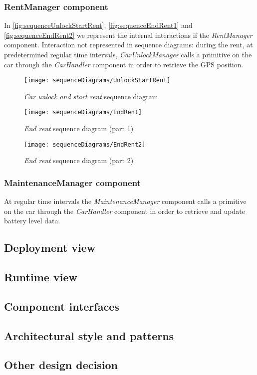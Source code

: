 \subsubsection{RentManager component}
In \autoref{fig:sequenceUnlockStartRent}, \autoref{fig:sequenceEndRent1} and \autoref{fig:sequenceEndRent2} we represent the internal interactions if the \emph{RentManager} component.
Interaction not represented in sequence diagrams: during the rent, at predetermined regular time intervals, \emph{CarUnlockManager} calls a primitive on the car through the \emph{CarHandler} component in order to retrieve the GPS position.
\begin{figure}[h!]
	\centering
	\texttt{[image: sequenceDiagrams/UnlockStartRent]}
	\caption{
		\label{fig:sequenceUnlockStartRent} 
		\emph{Car unlock and start rent} sequence diagram
	}
\end{figure}
\begin{figure}[h!]
	\centering
	\texttt{[image: sequenceDiagrams/EndRent]}
	\caption{
		\label{fig:sequenceEndRent1} 
		\emph{End rent} sequence diagram (part 1)
	}
\end{figure}
\begin{figure}[h!]
	\centering
	\texttt{[image: sequenceDiagrams/EndRent2]}
	\caption{
		\label{fig:sequenceEndRent2} 
		\emph{End rent} sequence diagram (part 2)
	}
\end{figure}


\clearpage
\subsubsection{MaintenanceManager component}
At regular time intervals the \emph{MaintenanceManager} component calls a primitive on the car through the \emph{CarHandler} component in order to retrieve and update battery level data.

\subsection{Deployment view}
\subsection{Runtime view}
\subsection{Component interfaces}
\subsection{Architectural style and patterns}
\subsection{Other design decision}
